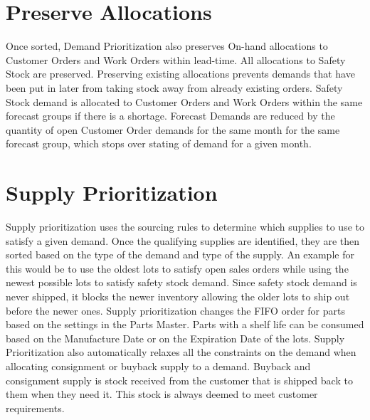 \section{Preserve Allocations}
Once sorted, Demand Prioritization also preserves On-hand allocations to Customer Orders and Work Orders within lead-time. 
All allocations to Safety Stock are preserved. 
Preserving existing allocations prevents demands that have been put in later from taking stock away from already existing orders. 
Safety Stock demand is allocated to Customer Orders and Work Orders within the same forecast groups if there is a shortage. 
Forecast Demands are reduced by the quantity of open Customer Order demands for the same month for the same forecast group, which stops over stating of demand for a given month.

\section{Supply Prioritization}
Supply prioritization uses the sourcing rules to determine which supplies to use to satisfy a given demand. Once the qualifying supplies are identified, they are then sorted based on the type of the demand and type of the supply. An example for this would be to use the oldest lots to satisfy open sales orders while using the newest possible lots to satisfy safety stock demand. Since safety stock demand is never shipped, it blocks the newer inventory allowing the older lots to ship out before the newer ones. Supply prioritization changes the FIFO order for parts based on the settings in the Parts Master. Parts with a shelf life can be consumed based on the Manufacture Date or on the Expiration Date of the lots. Supply Prioritization also automatically relaxes all the constraints on the demand when allocating consignment or buyback supply to a demand. Buyback and consignment supply is stock received from the customer that is shipped back to them when they need it. This stock is always deemed to meet customer requirements.

